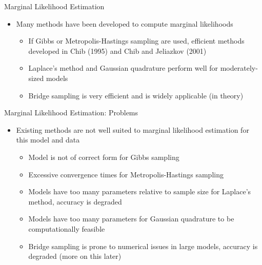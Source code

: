 \documentclass{beamer}
\begin{document}
\begin{frame}{Marginal Likelihood Estimation}
\begin{itemize}
	\item Many methods have been developed to compute marginal likelihoods
		\begin{itemize}
			\item If Gibbs or Metropolis-Hastings sampling are used, efficient methods developed in Chib (1995) and Chib and Jeliazkov (2001)
			\item Laplace's method and Gaussian quadrature perform well for moderately-sized models
			\item Bridge sampling is very efficient and is widely applicable (in theory)
		\end{itemize}
\end{itemize}
\end{frame}

\begin{frame}{Marginal Likelihood Estimation: Problems}
\begin{itemize}
	\item Existing methods are not well suited to marginal likelihood estimation for this model and data
	\begin{itemize}
		\item Model is not of correct form for Gibbs sampling
		\item Excessive convergence times for Metropolis-Hastings sampling
		\item Models have too many parameters relative to sample size for Laplace's method, accuracy is degraded
		\item Models have too many parameters for Gaussian quadrature to be computationally feasible
		\item Bridge sampling is prone to numerical issues in large models, accuracy is degraded (more on this later)
	\end{itemize}
\end{itemize}
\end{frame}
\end{document}
